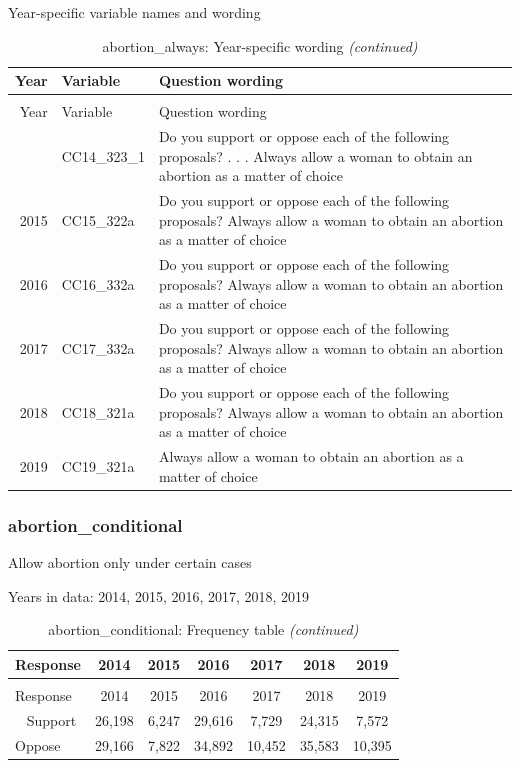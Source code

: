 \documentclass[12pt]{article}
\begin{document}
Year-specific variable names and wording

\begin{longtable}[t]{rl>{\raggedright\arraybackslash}p{10cm}}
\caption{\label{tab:unnamed-chunk-4}abortion\_always: Year-specific wording}\\
\toprule
Year & Variable & Question wording\\
\midrule
\endfirsthead
\caption[]{abortion\_always: Year-specific wording \textit{(continued)}}\\
\toprule
Year & Variable & Question wording\\
\midrule
\endhead
\
\endfoot
\bottomrule
\endlastfoot
2014 & CC14\_323\_1 & Do you support or oppose each of the following proposals? . . . Always allow a woman to obtain an abortion as a matter of choice\\
2015 & CC15\_322a & Do you support or oppose each of the following proposals? Always allow a woman to obtain an abortion as a matter of choice\\
2016 & CC16\_332a & Do you support or oppose each of the following proposals? Always allow a woman to obtain an abortion as a matter of choice\\
2017 & CC17\_332a & Do you support or oppose each of the following proposals? Always allow a woman to obtain an abortion as a matter of choice\\
2018 & CC18\_321a & Do you support or oppose each of the following proposals? Always allow a woman to obtain an abortion as a matter of choice\\
2019 & CC19\_321a & Always allow a woman to obtain an abortion as a matter of choice\\*
\end{longtable}

\subsubsection{abortion\_conditional}\label{abortion_conditional}

Allow abortion only under certain cases

Years in data: 2014, 2015, 2016, 2017, 2018,
2019\begingroup\fontsize{10}{12}\selectfont

\begin{longtable}[t]{lcccccc}
\caption{\label{tab:unnamed-chunk-4}abortion\_conditional: Frequency table}\\
\toprule
Response & 2014 & 2015 & 2016 & 2017 & 2018 & 2019\\
\midrule
\endfirsthead
\caption[]{abortion\_conditional: Frequency table \textit{(continued)}}\\
\toprule
Response & 2014 & 2015 & 2016 & 2017 & 2018 & 2019\\
\midrule
\endhead
\
\endfoot
\bottomrule
\endlastfoot
Support & 26,198 & 6,247 & 29,616 & 7,729 & 24,315 & 7,572\\
Oppose & 29,166 & 7,822 & 34,892 & 10,452 & 35,583 & 10,395\\*
\end{longtable}
\end{document}
